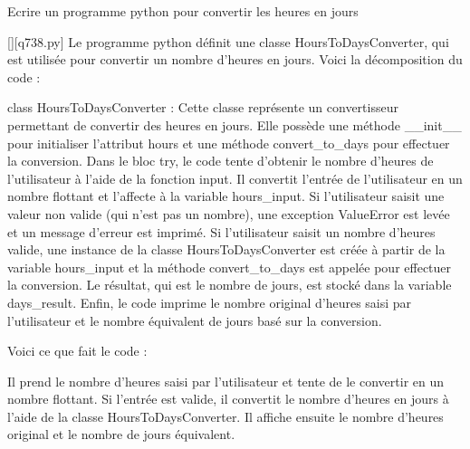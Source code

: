         \question
        Ecrire un programme python pour convertir les heures en jours
        \par
        \begin{solution}
            \renewcommand{\nomfichier}{q738.py}
            \pythonfile{\chemincode \nomfichier}[][\nomfichier]
            Le programme python définit une classe HoursToDaysConverter, qui est utilisée pour convertir un nombre d'heures en jours. Voici la décomposition du code :

    class HoursToDaysConverter : Cette classe représente un convertisseur permettant de convertir des heures en jours. Elle possède une méthode \_\_init\_\_ pour initialiser l'attribut hours et une méthode convert\_to\_days pour effectuer la conversion.
    Dans le bloc try, le code tente d'obtenir le nombre d'heures de l'utilisateur à l'aide de la fonction input. Il convertit l'entrée de l'utilisateur en un nombre flottant et l'affecte à la variable hours\_input. Si l'utilisateur saisit une valeur non valide (qui n'est pas un nombre), une exception ValueError est levée et un message d'erreur est imprimé.
    Si l'utilisateur saisit un nombre d'heures valide, une instance de la classe HoursToDaysConverter est créée à partir de la variable hours\_input et la méthode convert\_to\_days est appelée pour effectuer la conversion.
    Le résultat, qui est le nombre de jours, est stocké dans la variable days\_result.
    Enfin, le code imprime le nombre original d'heures saisi par l'utilisateur et le nombre équivalent de jours basé sur la conversion.

Voici ce que fait le code :

    Il prend le nombre d'heures saisi par l'utilisateur et tente de le convertir en un nombre flottant.
    Si l'entrée est valide, il convertit le nombre d'heures en jours à l'aide de la classe HoursToDaysConverter.
    Il affiche ensuite le nombre d'heures original et le nombre de jours équivalent.
        \end{solution}
        

